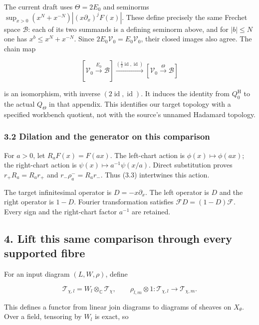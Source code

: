 \documentclass[
]{article}
\begin{document}
The current draft uses \(\Theta=2E_0\) and seminorms
\(\sup_{x>0}(x^N+x^{-N})|(x\partial_x)^jF(x)|\). These define precisely
the same Frechet space \(\mathscr B\): each of its two summands is a
defining seminorm above, and for \(|b|\le N\) one has
\(x^b\le x^N+x^{-N}\). Since \(2E_0\mathscr V_0=E_0\mathscr V_0\), their
closed images also agree. The chain map

\[
[\mathscr V_0\xrightarrow{E_0}\mathscr B]
\xrightarrow{(\frac12\operatorname{id},\operatorname{id})}
[\mathscr V_0\xrightarrow{\Theta}\mathscr B]
\]

is an isomorphism, with inverse
\((2\operatorname{id},\operatorname{id})\). It induces the identity from
\(Q_0^{\mathrm H}\) to the actual \(Q_\Theta\) in that appendix. This
identifies our target topology with a specified workbench quotient, not
with the source's unnamed Hadamard topology.

\subsubsection{3.2 Dilation and the generator on this
comparison}\label{dilation-and-the-generator-on-this-comparison}

For \(a>0\), let \(R_aF(x)=F(ax)\). The left-chart action is
\(\phi(x)\mapsto\phi(ax)\); the right-chart action is
\(\psi(x)\mapsto a^{-1}\psi(x/a)\). Direct substitution proves
\(r_+R_a=R_ar_+\) and \(r_-\rho_a^-=R_ar_-\). Thus (3.3) intertwines
this action.

The target infinitesimal operator is \(D=-x\partial_x\). The left
operator is \(D\) and the right operator is \(1-D\). Fourier
transformation satisfies \(\mathcal F D=(1-D)\mathcal F\). Every sign
and the right-chart factor \(a^{-1}\) are retained.

\subsection{4. Lift this same comparison through every supported
fibre}\label{lift-this-same-comparison-through-every-supported-fibre}

For an input diagram \((L,W,\rho)\), define

\[
\mathcal T_{\chi,l}=W_l\otimes_{\mathbb C}\mathcal T_\chi,
\qquad \rho_{l,m}\otimes1:\mathcal T_{\chi,l}\to\mathcal T_{\chi,m}.
\]

This defines a functor from linear join diagrams to diagrams of sheaves
on \(X_\theta\). Over a field, tensoring by \(W_l\) is exact, so
\end{document}
